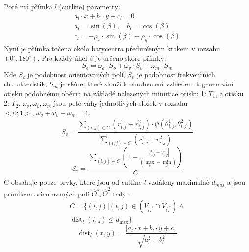 \documentclass[a4paper,11pt]{article}
\begin{document}
\begin{multicols*}{2}
    Poté má přímka $l$ (cutline) parametry:
    \begin{equation}
        \begin{array}{l}
        a_{l} \cdot x+b_{l} \cdot y+c_{l}=0 \\
        a_{l}=\sin (\beta), \quad b_{l}=\cos (\beta) \\
        c_{l}=-\rho_{x} \cdot \sin (\beta)-\rho_{y} \cdot \cos (\beta)
        \end{array}
    \end{equation}
    Nyní je přímka točena okolo barycentra předurčeným krokem v rozsahu $(0^{\circ},180^{\circ})$. Pro každý úhel $\beta$ je určeno skóre přímky:
    \begin{equation}
        S_{c}=\omega_{o} \cdot S_{o}+\omega_{v} \cdot S_{v}+\omega_{m} \cdot S_{m}
    \end{equation}
    Kde $S_o$ je podobnost orientovaných polí, $S_v$ je podobnost frekvenčních charakteristik, $S_m$ je skóre, které slouží k ohodnocení vzhledem k generování otisku podobnému oběma na základě nalezených minutiae otisku 1: $T_1$, a otisku 2: $T_2$. $\omega_{o}, \omega_{v}, \omega_{m}$ jsou poté váhy jednotlivých složek v rozsahu \\$<0;1>$, $\omega_{o} + \omega_{v} + \omega_{m} = 1$.
    \begin{equation}
        S_{o}=\frac{\sum_{(i, j) \in C}\left(r_{i, j}^{1}+r_{i, j}^{2}\right) \cdot \psi\left(\theta_{i, j}^{1}, \theta_{i, j}^{2}\right)}{\sum_{(i, j) \in C}\left(r_{i, j}^{1}+r_{i, j}^{2}\right)}
    \end{equation}
    \begin{equation}
        S_{v}=\frac{\sum_{(i, j) \in C}\left(1-\frac{\left|v_{i, j}^{1}-v_{i, j}^{2}\right|}{\left(\max _{F}-\min _{F}\right)}\right)}{|C|}
    \end{equation}
    C obsahuje pouze prvky, které jsou od cutline $l$ vzdáleny maximálně $d_{max}$ a jsou průnikem orientovaných polí $\hat{O}^{1}, \hat{O}^{2}$ tedy :
    \begin{equation}
      \begin{multlined}
          C=\{(i, j) |(i, j) \in\left(V_{\hat{O}^{1}} \cap V_{\hat{O}^{2}}\right) \wedge \\\operatorname{dist}_{l}(i, j) \leq d_{\max }\}
      \end{multlined}
     \end{equation}
     \begin{equation}
         \operatorname{dist}_{l}(x, y)=\frac{\left|a_{l} \cdot x+b_{l} \cdot y+c_{l}\right|}{\sqrt{a_{l}^{2}+b_{l}^{2}}}

\end{equation}
\end{multicols*}
\end{document}
